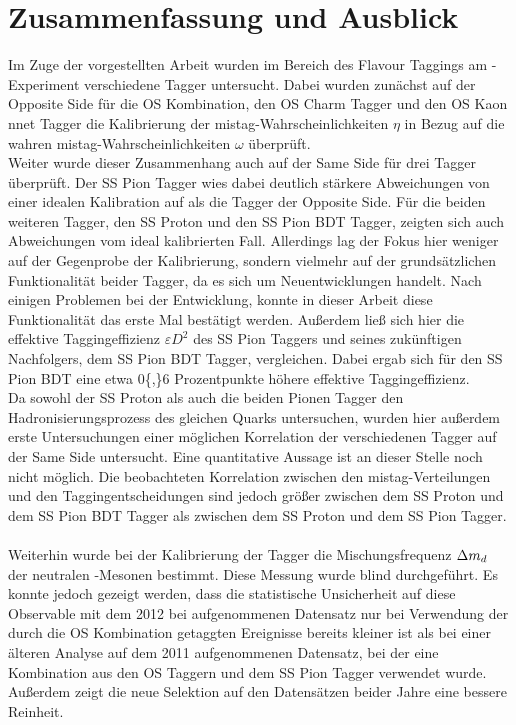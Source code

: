 \chapter{Zusammenfassung und Ausblick}

Im Zuge der vorgestellten Arbeit wurden im Bereich des Flavour Taggings am \lhcb-Experiment verschiedene Tagger untersucht. Dabei wurden zunächst auf der Opposite Side für die OS Kombination, den OS Charm Tagger und den OS Kaon nnet Tagger die Kalibrierung der mistag-Wahrscheinlichkeiten $\eta$ in Bezug auf die wahren mistag-Wahrscheinlichkeiten $\omega$ überprüft.\\
Weiter wurde dieser Zusammenhang auch auf der Same Side für drei Tagger überprüft. Der SS Pion Tagger wies dabei deutlich stärkere Abweichungen von einer idealen Kalibration auf als die Tagger der Opposite Side. Für die beiden weiteren Tagger, den SS Proton und den SS Pion BDT Tagger, zeigten sich auch Abweichungen vom ideal kalibrierten Fall. Allerdings lag der Fokus hier weniger auf der Gegenprobe der Kalibrierung, sondern vielmehr auf der grundsätzlichen Funktionalität beider Tagger, da es sich um Neuentwicklungen handelt. Nach einigen Problemen bei der Entwicklung, konnte in dieser Arbeit diese Funktionalität das erste Mal bestätigt werden. Außerdem ließ sich hier die effektive Taggingeffizienz $\varepsilon D^2$ des SS Pion Taggers und  seines zukünftigen Nachfolgers, dem SS Pion BDT Tagger, vergleichen. Dabei ergab sich für den SS Pion BDT eine etwa \num{0{,}6} Prozentpunkte höhere effektive Taggingeffizienz.\\
Da sowohl der SS Proton als auch die beiden Pionen Tagger den Hadronisierungsprozess des gleichen Quarks untersuchen, wurden hier außerdem erste Untersuchungen einer möglichen Korrelation der verschiedenen Tagger auf der Same Side untersucht. Eine quantitative Aussage ist an dieser Stelle noch nicht möglich. Die beobachteten Korrelation zwischen den mistag-Verteilungen und den Taggingentscheidungen sind jedoch größer zwischen dem SS Proton und dem SS Pion BDT Tagger als zwischen dem SS Proton und dem SS Pion Tagger. \\ 
\\
Weiterhin wurde bei der Kalibrierung der Tagger die Mischungsfrequenz ${\Delta m_{{d}}}$  der neutralen \Bz-Mesonen bestimmt. Diese Messung wurde blind durchgeführt. Es konnte jedoch gezeigt werden, dass die statistische Unsicherheit auf diese Observable mit dem \num{2012} bei \lhcb aufgenommenen Datensatz nur bei Verwendung der durch die OS Kombination getaggten Ereignisse bereits kleiner ist als bei einer älteren Analyse auf dem \num{2011} aufgenommenen Datensatz, bei der eine Kombination aus den OS Taggern und dem SS Pion Tagger verwendet wurde. Außerdem zeigt die neue Selektion auf den Datensätzen beider Jahre eine bessere Reinheit. \\
